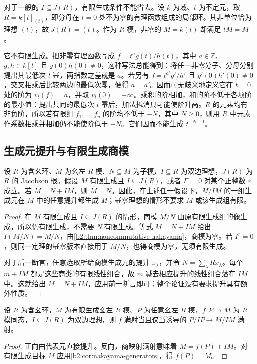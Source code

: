 对于一般的 \(I\subseteq J(R)\)，有限生成条件不能省去。设 \(k\) 为域、\(t\) 为不定元，取 \(R=k[t]_{(t)}\)，即分母在 \(t=0\) 处不为零的有理函数组成的局部环。其非单位恰为理想 \((t)\)，故 \(J(R)=(t)\)。作为 \(R\) 模，非零的 \(M=k(t)\) 却满足 \(tM=M\)。

\ProseParagraphBreak
它不有限生成。把非零有理函数写成 \(f=t^a g(t)/h(t)\)，其中 \(a\in\mathbb Z\)、\(g,h\in k[t]\) 且 \(g(0)h(0)\ne0\)，这种写法总能得到：将任一非零分子、分母分别提出其最低次 \(t\) 幂，两指数之差就是 \(a\)。若另有 \(f=t^{a'}g'/h'\) 且 \(g'(0)h'(0)\ne0\)，交叉相乘后比较两边的最低次幂，便得 \(a=a'\)。因而可无歧义地定义它在 \(t=0\) 处的阶为 \(v_t(f)=a\)，并取 \(v_t(0)=+\infty\)。乘积的阶相加，和的阶不低于各项阶的最小值：提出共同的最低次 \(t\) 幂后，加法抵消只可能使阶升高。\(R\) 的元素均有非负阶，所以若有限组 \(f_1,\ldots,f_n\) 的阶均不低于 \(-N\)，其中 \(N\ge0\)，则用 \(R\) 中元素作系数相乘并相加仍不能使阶低于 \(-N\)。它们因而不能生成 \(t^{-N-1}\)。

\subsection{生成元提升与有限生成商模}
\label{b2:subsec:1402:02}

\begin{corollary}[生成元提升]\label{b2:cor:nakayama-generators}
	设 \(R\) 为含幺环、\(M\) 为幺左 \(R\) 模、\(N\subseteq M\) 为子模，\(I\subseteq R\) 为双边理想，\(J(R)\) 为 \(R\) 的 Jacobson 根。假设 \(M\) 有限生成且 \(I\subseteq J(R)\)，或者 \(I^r=0\) 对某个正整数 \(r\) 成立。若 \(M=N+IM\)，则 \(M=N\)。因此，在上述任一假设下，\(M/IM\) 的一组生成元在 \(M\) 中的任意提升都生成 \(M\)；幂零理想的情形不要求 \(M\) 或该生成组有限。
\end{corollary}
\begin{proof}
	在 \(M\) 有限生成且 \(I\subseteq J(R)\) 的情形，商模 \(M/N\) 由原有限生成组的像生成，所以仍有限生成，不需要 \(N\) 有限生成。等式 \(M=N+IM\) 给出 \(I(M/N)=M/N\)，由\cref{b2:thm:noncommutative-nakayama}，商模为零。若 \(I^r=0\)，则同一定理的幂零版本直接用于 \(M/N\)，也得商模为零，无须有限生成。

	对于后一断言，任意选取所给商模生成元的提升 \(x_\lambda\)，并令 \(N=\sum_\lambda Rx_\lambda\)。每个 \(m+IM\) 都是这些商类的有限线性组合，故 \(m\) 减去相应提升的线性组合落在 \(IM\) 中。这就给出 \(M=N+IM\)，应用前一断言即可；整个论证没有要求提升具有额外性质。
\end{proof}

\begin{proposition}\label{b2:prop:nakayama-surjectivity-test}
	设 \(R\) 为含幺环，\(M\) 为有限生成幺左 \(R\) 模、\(P\) 为任意幺左 \(R\) 模，\(f:P\to M\) 为 \(R\) 模同态，\(I\subseteq J(R)\) 为双边理想，则 \(f\) 满射当且仅当诱导的 \(P/IP\to M/IM\) 满射。
\end{proposition}
\begin{proof}
	正向由代表元直接提升。反向，商映射满射意味着 \(M=f(P)+IM\)。对有限生成目标 \(M\) 应用\cref{b2:cor:nakayama-generators}，得 \(f(P)=M\)。
\end{proof}

